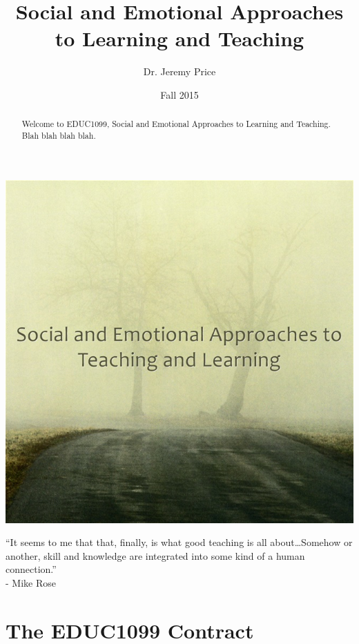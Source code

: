 \documentclass[two-side]{tufte-handout}
\title{Social and Emotional Approaches to Learning and Teaching}
\author{Dr. Jeremy Price}
\date{Fall 2015}  %
\begin{document}
\maketitle%

\begin{abstract}
Welcome to EDUC1099, Social and Emotional Approaches to Learning and Teaching. Blah blah blah blah.\end{abstract}

\bigskip

	\begin{center}
		\includegraphics[width=0.40\linewidth]{sealt-logo.jpg}

		\bigskip

		\Large
		\enquote{It seems to me that that, finally, is what good teaching is all about\ldots Somehow or another, skill and knowledge are integrated into some kind of a human connection.}\\- Mike Rose
		\normalsize
	\end{center}



\newpage

\part{The EDUC1099 Contract}

\begin{fullwidth}



\end{fullwidth}

\newpage


\end{document}
